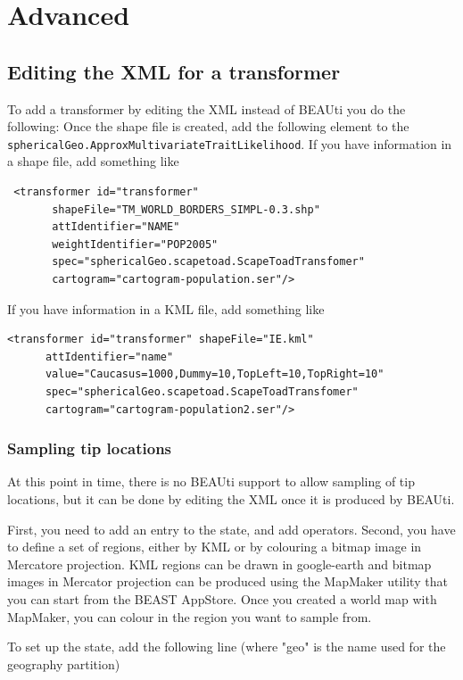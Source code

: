 \documentclass{article}
\begin{document}
\section*{Advanced}
\subsection*{Editing the XML for a transformer}
To add a transformer by editing the XML instead of BEAUti you do the following: Once the shape file is created, add the following element to the {\tt sphericalGeo.ApproxMultivariateTraitLikelihood}. If you have information in a shape file, add something like

\begin{verbatim}
 <transformer id="transformer" 
       shapeFile="TM_WORLD_BORDERS_SIMPL-0.3.shp" 
       attIdentifier="NAME" 
       weightIdentifier="POP2005" 
       spec="sphericalGeo.scapetoad.ScapeToadTransfomer"
       cartogram="cartogram-population.ser"/> 
 \end{verbatim}

If you have information in a KML file, add something like

\begin{verbatim}
<transformer id="transformer" shapeFile="IE.kml"
      attIdentifier="name"
      value="Caucasus=1000,Dummy=10,TopLeft=10,TopRight=10"
      spec="sphericalGeo.scapetoad.ScapeToadTransfomer"
      cartogram="cartogram-population2.ser"/>
\end{verbatim}

\subsubsection*{Sampling tip locations}
At this point in time, there is no BEAUti support to allow sampling of tip locations, but it can be done by editing the XML once it is produced by BEAUti.

First, you need to add an entry to the state, and add operators.
Second, you have to define a set of regions, either by KML or by colouring a bitmap image in Mercatore projection. KML regions can be drawn in google-earth and bitmap images in Mercator projection can be produced using the MapMaker utility that you can start from the BEAST AppStore. Once you created a world map with MapMaker, you can colour in the region you want to sample from.

To set up the state, add the following line (where "geo" is the name used for the geography partition)
\end{document}
